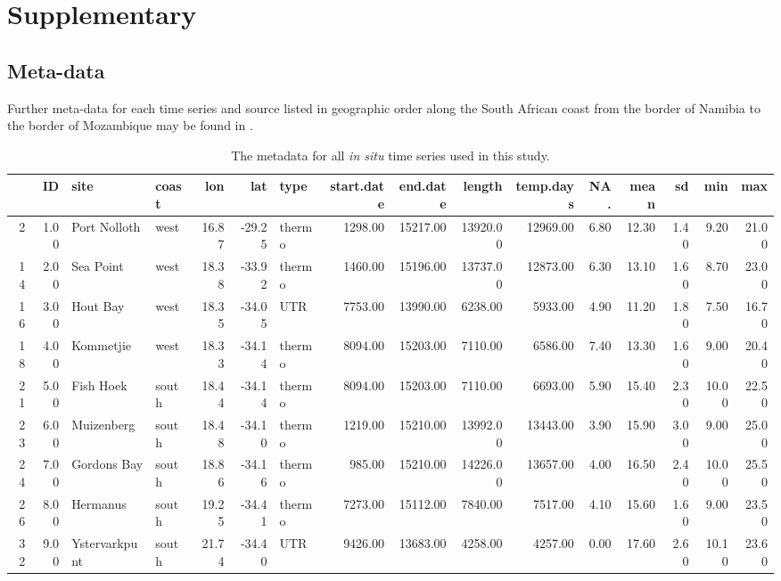 \documentclass[a4paper,10pt,review]{elsarticle}
\begin{document}
\section*{Supplementary}
\subsection*{Meta-data}
Further meta-data for each time series and source listed in geographic order along the South African coast from the border of Namibia to the border of Mozambique may be found in .

\begin{table}[]
\caption{\small The metadata for all \emph{in situ} time series used in this study.}
\label{tableS1}
\centering
\tiny
\begin{tabular}{rrllrrlrrrrrrrrr}
  \hline
 & ID & site & coast & lon & lat & type & start.date & end.date & length & temp.days & NA. & mean & sd & min & max \\ 
  \hline
2 & 1.00 & Port Nolloth & west & 16.87 & -29.25 & thermo & 1298.00 & 15217.00 & 13920.00 & 12969.00 & 6.80 & 12.30 & 1.40 & 9.20 & 21.00 \\ 
  14 & 2.00 & Sea Point & west & 18.38 & -33.92 & thermo & 1460.00 & 15196.00 & 13737.00 & 12873.00 & 6.30 & 13.10 & 1.60 & 8.70 & 23.00 \\ 
  16 & 3.00 & Hout Bay & west & 18.35 & -34.05 & UTR & 7753.00 & 13990.00 & 6238.00 & 5933.00 & 4.90 & 11.20 & 1.80 & 7.50 & 16.70 \\ 
  18 & 4.00 & Kommetjie & west & 18.33 & -34.14 & thermo & 8094.00 & 15203.00 & 7110.00 & 6586.00 & 7.40 & 13.30 & 1.60 & 9.00 & 20.40 \\ 
  21 & 5.00 & Fish Hoek & south & 18.44 & -34.14 & thermo & 8094.00 & 15203.00 & 7110.00 & 6693.00 & 5.90 & 15.40 & 2.30 & 10.00 & 22.50 \\ 
  23 & 6.00 & Muizenberg & south & 18.48 & -34.10 & thermo & 1219.00 & 15210.00 & 13992.00 & 13443.00 & 3.90 & 15.90 & 3.00 & 9.00 & 25.00 \\ 
  24 & 7.00 & Gordons Bay & south & 18.86 & -34.16 & thermo & 985.00 & 15210.00 & 14226.00 & 13657.00 & 4.00 & 16.50 & 2.40 & 10.00 & 25.50 \\ 
  26 & 8.00 & Hermanus & south & 19.25 & -34.41 & thermo & 7273.00 & 15112.00 & 7840.00 & 7517.00 & 4.10 & 15.60 & 1.60 & 9.00 & 23.50 \\ 
  32 & 9.00 & Ystervarkpunt & south & 21.74 & -34.40 & UTR & 9426.00 & 13683.00 & 4258.00 & 4257.00 & 0.00 & 17.60 & 2.60 & 10.10 & 23.60 \\ 

\end{tabular}
\end{table}
\end{document}
